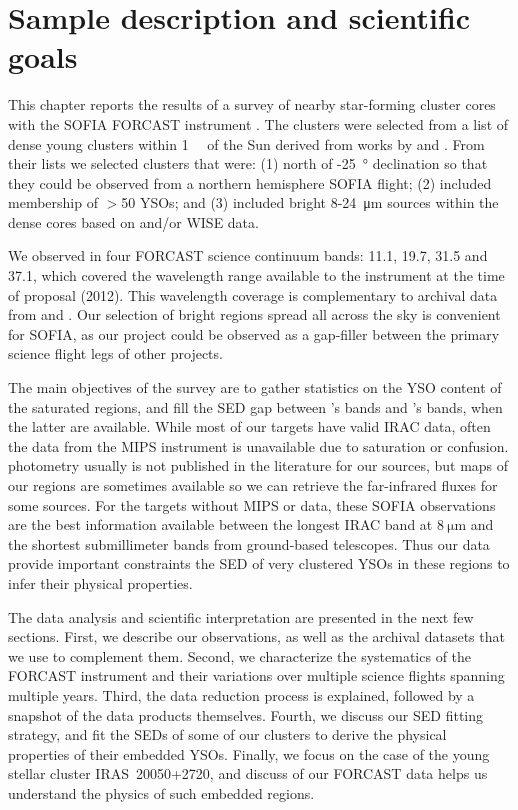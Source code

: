\section{Sample description and scientific goals}


This chapter reports the results of a survey of nearby star-forming cluster cores with the SOFIA FORCAST instrument \citep{Herter:2012hv}. The clusters were selected from a list of dense young clusters within \SI{1}{\kilo\pc} of the Sun derived from works by \citet{Porras:2003kxa} and \citet{Gutermuth:2009gca}. From their lists we selected clusters that were: (1) north of -\SI{25}{\degree} declination so that they could be observed from a northern hemisphere SOFIA flight; (2) included membership of $>$50 YSOs; and (3) included bright 8-\SI{24}{\micro\meter} sources within the dense cores based on \Spitzer and/or WISE data. 

We observed in four FORCAST science continuum bands: 11.1, 19.7, 31.5 and \SI{37.1}{\micron}, which covered the wavelength range available to the instrument at the time of proposal (2012). This wavelength coverage is complementary to archival data from \Spitzer and \Herschel. Our selection of bright regions spread all across the sky is convenient for SOFIA, as our project could be observed as a gap-filler between the primary science flight legs of other projects.

The main objectives of the survey are to gather statistics on the YSO content of the \Spitzer saturated regions, and fill the SED gap between {\Spitzer}'s bands and {\Herschel}'s bands, when the latter are available. While most of our targets have valid \Spitzer IRAC data, often the data from the MIPS instrument is unavailable due to saturation or confusion. \Herschel photometry usually is not published in the literature for our sources, but maps of our regions are sometimes available so we can retrieve the far-infrared fluxes for some sources. For the targets without MIPS or \Herschel data, these SOFIA observations are the best information available between the longest IRAC band at $\SI{8}{\um}$ and the shortest submillimeter bands from ground-based telescopes. Thus our data provide important constraints the SED of very clustered YSOs in these regions to infer their physical properties.


The data analysis and scientific interpretation are presented in the next few sections. First, we describe our observations, as well as the archival datasets that we use to complement them. Second, we characterize the systematics of the FORCAST instrument and their variations over multiple science flights spanning multiple years. Third, the data reduction process is explained, followed by a snapshot of the data products themselves. Fourth, we discuss our SED fitting strategy, and fit the SEDs of some of our clusters to derive the physical properties of their embedded YSOs. Finally, we focus on the case of the young stellar cluster IRAS~20050+2720, and discuss of our FORCAST data helps us understand the physics of such embedded regions.  



